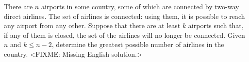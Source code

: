 \problem{}
There are $n$ airports in some country, some of which are connected by two-way direct
airlines.
The set of airlines is connected: using them, it is possible to reach any airport from
any other.
Suppose that there are at least $k$ airports such that, if any of them is closed, the
set of the airlines will no longer be connected.
Given $n$ and $k \leq n - 2$, determine the greatest possible number of airlines in the
country.
\solution
<FIXME: Missing English solution.>
\endproblem
